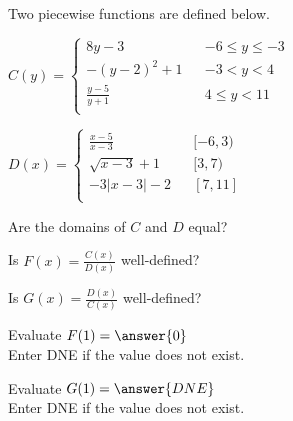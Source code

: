 \documentclass{ximera}
\begin{document}
\begin{definition}
Two piecewise functions are defined below.

$C(y) =   
\left \{ \begin{aligned}     
8 y - 3 && -6 \leq y \leq -3 \\        
-(y-2)^2 + 1 && -3 < y < 4 \\      
\frac{y-5}{y+1} && 4 \leq y < 11\\       
\end{aligned} \right .$ 




$D(x) =   
\left \{ \begin{aligned}     
\frac{x-5}{x-3} && [-6, 3) \\        
\sqrt{x-3} + 1 && [3, 7) \\      
-3|x-3|-2 && [7, 11]\\       
\end{aligned} \right .$ 


\end{definition}





\begin{exercise}
Are the domains of $C$ and $D$ equal?

\begin{multipleChoice}
\end{multipleChoice}

\end{exercise}


\begin{exercise}
Is $F(x) = \frac{C(x)}{D(x)}$ well-defined?

\begin{multipleChoice}
\end{multipleChoice}

\end{exercise}



\begin{exercise}
Is $G(x) = \frac{D(x)}{C(x)}$ well-defined?

\begin{multipleChoice}
\end{multipleChoice}

\end{exercise}








\begin{exercise}

Evaluate $F(1) = \answer{0}$ \\
Enter DNE if the value does not exist.

\end{exercise}


\begin{exercise}

Evaluate $G(1) = \answer{DNE}$ \\
Enter DNE if the value does not exist.

\end{exercise}
\end{document}

